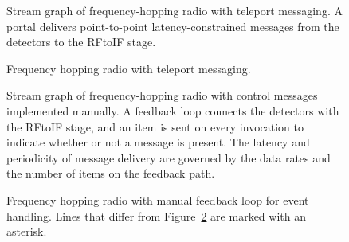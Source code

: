 \clearpage
\begin{figure}[t]
\caption{\small Stream graph of frequency-hopping radio with teleport messaging.  
A portal delivers point-to-point latency-constrained messages from the
detectors to the RFtoIF stage.
\protect\label{fig:fhr-streamit}}
\end{figure}

\begin{figure}[t]
\caption{\small Frequency hopping radio with teleport messaging. \protect\label{fig:freq1}}
\end{figure}

\clearpage
\begin{figure}[t]
\caption{\small Stream graph of frequency-hopping radio with control
messages implemented manually.  A feedback loop connects the detectors
with the RFtoIF stage, and an item is sent on every invocation to
indicate whether or not a message is present.  The latency and
periodicity of message delivery are governed by the data rates and the
number of items on the feedback
path. \protect\label{fig:fhr-manual}}
\end{figure}

\begin{figure}[t]
\caption{\small Frequency hopping radio with manual feedback loop for
event handling.  Lines that differ from Figure~\ref{fig:freq1} are
marked with an asterisk. \protect\label{fig:freq2}}
\end{figure}
\clearpage
